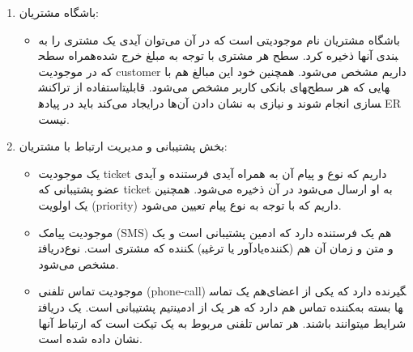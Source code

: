 \begin{enumerate}
\begin{itemize}
	\end{itemize}
	\item باشگاه مشتریان:
	\begin{itemize}
		\item 
		باشگاه مشتریان نام موجودیتی است که در آن می‌توان آیدی یک مشتری را به همراه سطح‎بندی آنها ذخیره کرد. سطح هر مشتری با توجه به مبلغ خرج شده که در موجودیت customer داریم مشخص می‌شود. همچنین خود این مبالغ هم با استفاده از تراکنش‎های بانکی کاربر مشخص می‌شود.
		قابلیت‎هایی که هر سطح ایجاد می‌کند باید در پیاده‎سازی انجام شوند و نیازی به نشان دادن آن‌ها در ER نیست.
	\end{itemize}
	\item بخش پشتیبانی و مدیریت ارتباط با مشتریان:
	\begin{itemize}
		\item 
یک موجودیت ticket داریم که نوع و پیام آن به همراه آیدی فرستنده و آیدی عضو پشتیبانی که ticket به او ارسال می‌شود در آن ذخیره می‌شود. همچنین یک اولویت (priority) داریم که با توجه به نوع پیام تعیین می‌شود.
		\item 
موجودیت پیامک (SMS) هم یک فرستنده دارد که ادمین پشتیبانی است و یک دریافت‎کننده که مشتری است. نوع (یادآور یا ترغیب‎کننده) و متن و زمان آن هم مشخص می‌شود.
		\item 
موجودیت تماس تلفنی (phone-call) هم یک تماس‎گیرنده دارد که یکی از اعضای تیم پشتیبانی است. یک دریافت‎کننده تماس هم دارد که هر یک از ادمین‎ها بسته به شرایط میتوانند باشند. هر تماس تلفنی مربوط به یک تیکت است که ارتباط آنها نشان داده شده است.
	\end{itemize}
\end{enumerate}